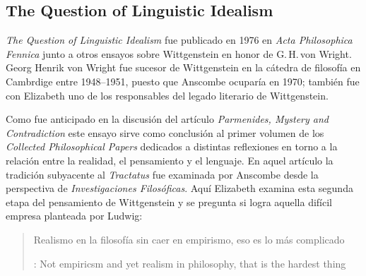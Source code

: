 \subsection{The Question of Linguistic Idealism}

\emph{The Question of Linguistic Idealism} fue publicado en 1976 en \emph{Acta Philosophica Fennica} junto a otros ensayos sobre Wittgenstein en honor de G.\,H.\,von Wright. Georg Henrik von Wright fue sucesor de Wittgenstein en la cátedra de filosofía en Cambrdige entre 1948--1951, puesto que Anscombe ocuparía en 1970; también fue con Elizabeth uno de los responsables del legado literario de Wittgenstein.

Como fue anticipado en la discusión del artículo \emph{Parmenides, Mystery and Contradiction} este ensayo sirve como conclusión al primer volumen de los \emph{Collected Philosophical Papers} dedicados a distintas reflexiones en torno a la relación entre la realidad, el pensamiento y el lenguaje. En aquel artículo la tradición subyacente al \emph{Tractatus} fue examinada por Anscombe desde la perspectiva de \emph{Investigaciones Filosóficas}. Aquí Elizabeth examina esta segunda etapa del pensamiento de Wittgenstein y se pregunta si logra aquella difícil empresa planteada por Ludwig: \blockquote[{\cite[112]{wittgenstein1956remmath}}: Not empiricsm and yet realism in philosophy, that is the hardest thing]{Realismo en la filosofía sin caer en empirismo, eso es lo más complicado}.

